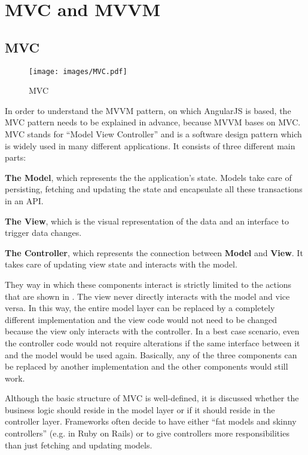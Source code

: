 \section{MVC and MVVM}
\label{sec:mvcmvvm}

\subsection{MVC}
\label{subsec:mvc}

\begin{figure}[htb]
  \centerline{\texttt{[image: images/MVC.pdf]}}
  \caption[MVC]{MVC}
  \label{fig:mvc}
\end{figure}

In order to understand the MVVM pattern, on which AngularJS is based, the MVC pattern needs to be explained in advance, because MVVM bases on MVC. MVC stands for ``Model View Controller'' and is a software design pattern which is widely used in many different applications. It consists of three different main parts:

\textbf{The Model}, which represents the the application's state. Models take care of persisting, fetching and updating the state and encapsulate all these transactions in an API.

\textbf{The View}, which is the visual representation of the data and an interface to trigger data changes.

\textbf{The Controller}, which represents the connection between \textbf{Model} and \textbf{View}. It takes care of updating view state and interacts with the model.

They way in which these components interact is strictly limited to the actions that are shown in . The view never directly interacts with the model and vice versa. In this way, the entire model layer can be replaced by a completely different implementation and the view code would not need to be changed because the view only interacts with the controller. In a best case scenario, even the controller code would not require alterations if the same interface between it and the model would be used again. Basically, any of the three components can be replaced by another implementation and the other components would still work.

Although the basic structure of MVC is well-defined, it is discussed whether the business logic should reside in the model layer or if it should reside in the controller layer. Frameworks often decide to have either ``fat models and skinny controllers'' (e.g. in Ruby on Rails) or to give controllers more responsibilities than just fetching and updating models.

